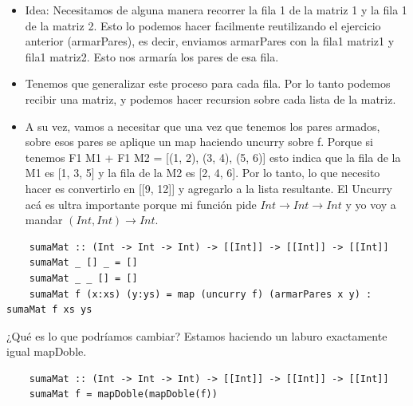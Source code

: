 \documentclass[10pt,a4paper]{article}
\begin{document}
\begin{itemize}
    \item Idea: Necesitamos de alguna manera recorrer la fila 1 de la matriz 1 y la fila 1 de la matriz 2. Esto lo podemos hacer facilmente reutilizando el ejercicio anterior (armarPares), es decir, enviamos armarPares con la fila1 matriz1 y fila1 matriz2. Esto nos armaría los pares de esa fila. 
    \item Tenemos que generalizar este proceso para cada fila. Por lo tanto podemos recibir una matriz, y podemos hacer recursion sobre cada lista de la matriz.
    \item A su vez, vamos a necesitar que una vez que tenemos los pares armados, sobre esos pares se aplique un map haciendo uncurry sobre f. Porque si tenemos F1 M1 + F1 M2 = [(1, 2), (3, 4), (5, 6)] esto indica que la fila de la M1 es [1, 3, 5] y la fila de la M2 es [2, 4, 6]. Por lo tanto, lo que necesito hacer es convertirlo en [[9, 12]] y agregarlo a la lista resultante. El Uncurry acá es ultra importante porque mi función pide $Int \rightarrow Int \rightarrow Int$ y yo voy a mandar $(Int, Int) \rightarrow Int$.
\end{itemize}
\begin{lstlisting}
    sumaMat :: (Int -> Int -> Int) -> [[Int]] -> [[Int]] -> [[Int]]
    sumaMat _ [] _ = []
    sumaMat _ _ [] = []
    sumaMat f (x:xs) (y:ys) = map (uncurry f) (armarPares x y) : sumaMat f xs ys
\end{lstlisting}
¿Qué es lo que podríamos cambiar? Estamos haciendo un laburo exactamente igual mapDoble. \\
\begin{lstlisting}
    sumaMat :: (Int -> Int -> Int) -> [[Int]] -> [[Int]] -> [[Int]]
    sumaMat f = mapDoble(mapDoble(f))
\end{lstlisting}
\end{document}
